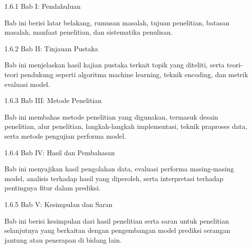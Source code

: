     1.6.1 Bab I: Pendahuluan
    
    Bab ini berisi latar belakang, rumusan masalah, tujuan penelitian, batasan masalah, manfaat penelitian, dan sistematika penulisan.
    
    1.6.2 Bab II: Tinjauan Pustaka

    Bab ini menjelaskan hasil kajian pustaka terkait topik yang diteliti, serta teori-teori pendukung seperti algoritma machine learning, teknik encoding, dan metrik evaluasi model.

    1.6.3 Bab III: Metode Penelitian

    Bab ini membahas metode penelitian yang digunakan, termasuk desain penelitian, alur penelitian, langkah-langkah implementasi, teknik praproses data, serta metode pengujian performa model.

    1.6.4 Bab IV: Hasil dan Pembahasan

    Bab ini menyajikan hasil pengolahan data, evaluasi performa masing-masing model, analisis terhadap hasil yang diperoleh, serta interpretasi terhadap pentingnya fitur dalam prediksi.

    1.6.5 Bab V: Kesimpulan dan Saran

    Bab ini berisi kesimpulan dari hasil penelitian serta saran untuk penelitian selanjutnya yang berkaitan dengan pengembangan model prediksi serangan jantung atau penerapan di bidang lain.
    



